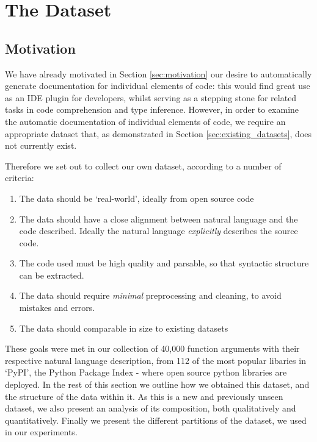 \chapter{The Dataset}
\label{the_dataset}

\section{Motivation}

We have already motivated in Section \ref{sec:motivation} our desire to automatically generate documentation for individual elements of code: this would find great use as an IDE plugin for developers, whilst serving as a stepping stone for related tasks in code comprehension and type inference.
However, in order to examine the automatic documentation of individual elements of code, we require an appropriate dataset that, as demonstrated in Section \ref{sec:existing_datasets}, does not currently exist.

Therefore we set out to collect our own dataset, according to a number of criteria:

\begin{enumerate}
    \item The data should be `real-world', ideally from open source code
    \item The data should have a close alignment between natural language and the code described. Ideally the natural language \textit{explicitly} describes the source code.
    \item The code used must be high quality and parsable, so that syntactic structure can be extracted.
    \item The data should require \textit{minimal} preprocessing and cleaning, to avoid mistakes and errors.
    \item The data should comparable in size to existing datasets
\end{enumerate}

These goals were met in our collection of 40,000 function arguments with their respective natural language description, from 112 of the most popular libaries in `PyPI', the Python Package Index - where open source python libraries are deployed. In the rest of this section we outline how we obtained this dataset, and the structure of the data within it. As this is a new and previously unseen dataset, we also present an analysis of its composition, both qualitatively and quantitatively.
Finally we present the different partitions of the dataset, we used in our experiments.


